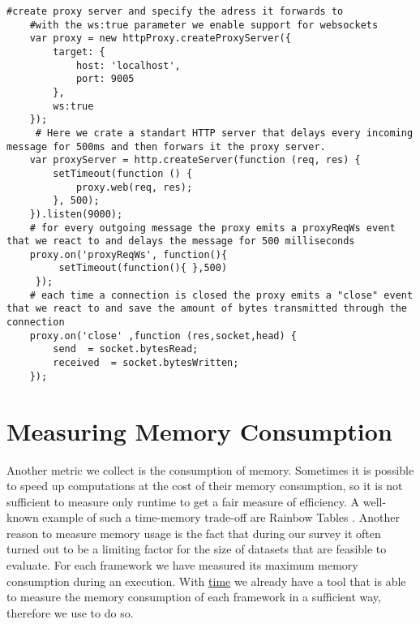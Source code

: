 \begin{lstlisting}[caption={Setting up a proxy that simulates latency with node-http-proxy}]
	#create proxy server and specify the adress it forwards to
	#with the ws:true parameter we enable support for websockets
 	var proxy = new httpProxy.createProxyServer({
 		target: {
 			host: 'localhost',
 			port: 9005
 		},
 		ws:true 
 	});
 	 # Here we crate a standart HTTP server that delays every incoming message for 500ms and then forwars it the proxy server.
 	var proxyServer = http.createServer(function (req, res) {
 		setTimeout(function () {
 			proxy.web(req, res);
 		}, 500);
 	}).listen(9000);
 	# for every outgoing message the proxy emits a proxyReqWs event that we react to and delays the message for 500 milliseconds
 	proxy.on('proxyReqWs', function(){
 		 setTimeout(function(){ },500) 
 	 });
  	# each time a connection is closed the proxy emits a "close" event that we react to and save the amount of bytes transmitted through the connection
 	proxy.on('close' ,function (res,socket,head) { 
 		send  = socket.bytesRead;
 		received  = socket.bytesWritten;
 	});
 \end{lstlisting}

\section{Measuring Memory Consumption}
Another metric we collect is the consumption of memory. Sometimes it is possible to speed up computations at the cost of their memory consumption, so it is not sufficient to measure only runtime to get a fair measure of efficiency. A well-known example of such a time-memory trade-off are Rainbow Tables \cite{rainbow}. Another reason to measure memory usage is the fact that during our survey it often turned out to be a limiting factor for the size of datasets that are feasible to evaluate. 
For each framework we have measured its maximum memory consumption during an execution. With \hyperref[time]{time} we already have a tool that is able to measure the memory consumption of each framework in a sufficient way, therefore we use  to do so.


 